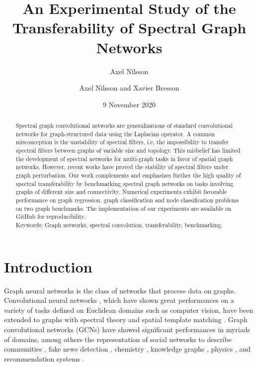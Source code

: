 \documentclass[letterpaper]{article} \usepackage{aaai21}  \usepackage{times}  \usepackage{helvet} \usepackage{courier}  \usepackage[hyphens]{url}  \usepackage{graphicx} \usepackage{natbib}  \usepackage{caption} \frenchspacing  \setlength{\pdfpagewidth}{8.5in}  \setlength{\pdfpageheight}{11in}
\title{An Experimental Study of the Transferability of Spectral Graph Networks}								\author{Axel Nilsson}								\date{9 November 2020}
\author{Axel Nilsson and Xavier Bresson\\
}
\begin{document}
\maketitle




\begin{abstract}
Spectral graph convolutional networks are generalizations of standard convolutional networks for graph-structured data using the Laplacian operator.
A common misconception is the unstability of spectral filters, i.e. the impossibility to transfer spectral filters between graphs of variable size and topology. This misbelief has limited the development of spectral networks for multi-graph tasks in favor of spatial graph networks.
However, recent works have proved the stability of spectral filters under graph perturbation.
Our work complements and emphasizes further the high quality of spectral transferability by benchmarking spectral graph networks on tasks involving graphs of different size and connectivity. Numerical experiments exhibit favorable performance on graph regression, graph classification and node classification problems on two graph benchmarks. The implementation of our experiments are available on GitHub for reproducibility.  \\
Keywords: Graph networks, spectral convolution, transferability, benchmarking.






\end{abstract}


\section{Introduction}
Graph neural networks \cite{scarselli_graph_2009} is the class of networks that process data on graphs. Convolutional neural networks \cite{lecun1998gradient}, which have shown great performances on a variety of tasks defined on Euclidean domains such as computer vision,
have been extended to graphs with spectral theory \cite{bruna_spectral_2014, defferrard_convolutional_nodate} and spatial template matching \cite{kipf_semi-supervised_2017}. Graph convolutional networks (GCNs) have showed significant performances in myriads of domains, among others the representation of social networks to describe communities \cite{kipf_semi-supervised_2017}, fake news detection \cite{monti_fake_2019},
chemistry \cite{gilmer_neural_2017}, knowledge graphs \cite{schlichtkrull_modeling_2017, hamilton_inductive_2017},
physics \cite{cranmer_learning_2019}, and
recommendation systems \cite{monti_geometric_nodate, ying_graph_2018}.
\end{document}
